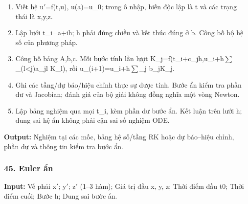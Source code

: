 \begin{enumerate}

\item Viết hệ u\ensuremath{\prime}=\allowbreak{}f(\allowbreak{}t,\allowbreak{}u),\allowbreak{} u(\allowbreak{}a)=\allowbreak{}u\_0;\allowbreak{} trong ô nhập,\allowbreak{} biến độc lập là t và các trạng thái là x,\allowbreak{}y,\allowbreak{}z.

\item Lập lưới t\_i=\allowbreak{}a+\allowbreak{}ih;\allowbreak{} h phải đúng chiều và kết thúc đúng ở b. Công bố bộ hệ số của phương pháp.

\item Công bố bảng A,\allowbreak{}b,\allowbreak{}c. Mỗi bước tính lần lượt K\_j=\allowbreak{}f(\allowbreak{}t\_i+\allowbreak{}c\_jh,\allowbreak{}u\_i+\allowbreak{}h\ensuremath{\sum}\_(\allowbreak{}l<j)a\_jl K\_l),\allowbreak{} rồi u\_(\allowbreak{}i+\allowbreak{}1)=\allowbreak{}u\_i+\allowbreak{}h\ensuremath{\sum}\_j b\_jK\_j.

\item Ghi các tầng/\allowbreak{}dự báo/\allowbreak{}hiệu chỉnh thực sự được tính. Bước ẩn kiểm tra phần dư và Jacobian;\allowbreak{} đánh giá của bộ giải không đồng nghĩa một vòng Newton.

\item Lập bảng nghiệm qua mọi t\_i,\allowbreak{} kèm phần dư bước ẩn. Kết luận trên lưới h;\allowbreak{} dung sai hệ ẩn không phải cận sai số nghiệm ODE.

\end{enumerate}

\textbf{Output:} Nghiệm tại các mốc,\allowbreak{} bảng hệ số/\allowbreak{}tầng RK hoặc dự báo–hiệu chỉnh,\allowbreak{} phần dư và thông tin kiểm tra bước ẩn.

\examplebreak\subsubsection*{45. Euler ẩn}

\textbf{Input:} Vế phải x\ensuremath{\prime};\allowbreak{} y\ensuremath{\prime};\allowbreak{} z\ensuremath{\prime} (\allowbreak{}1–3 hàm);\allowbreak{} Giá trị đầu x,\allowbreak{} y,\allowbreak{} z;\allowbreak{} Thời điểm đầu t0;\allowbreak{} Thời điểm cuối;\allowbreak{} Bước h;\allowbreak{} Dung sai bước ẩn.

